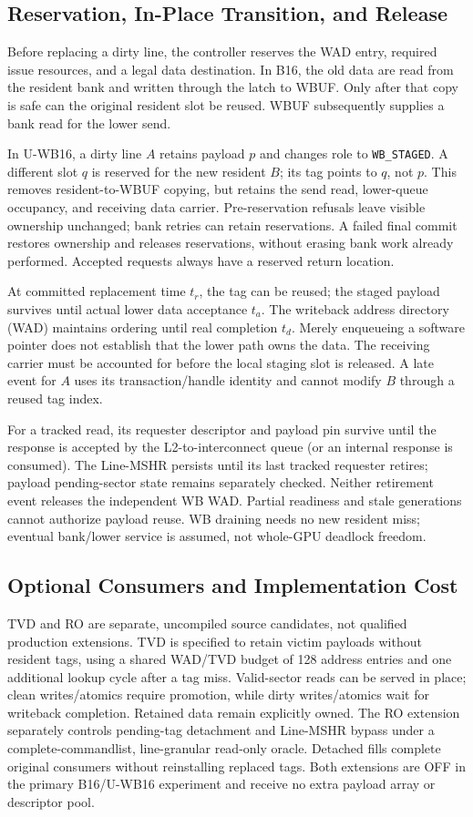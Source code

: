 \documentclass[conference,letterpaper]{IEEEtran}
\newcommand{\base}{B16}
\newcommand{\unif}{U-WB16}
\begin{document}
\subsection{Reservation, In-Place Transition, and Release}
Before replacing a dirty line, the controller reserves the WAD entry, required issue resources, and a legal data destination. In \base{}, the old data are read from the resident bank and written through the latch to WBUF. Only after that copy is safe can the original resident slot be reused. WBUF subsequently supplies a bank read for the lower send.

In \unif{}, a dirty line $A$ retains payload $p$ and changes role to \texttt{WB\_STAGED}. A different slot $q$ is reserved for the new resident $B$; its tag points to $q$, not $p$. This removes resident-to-WBUF copying, but retains the send read, lower-queue occupancy, and receiving data carrier. Pre-reservation refusals leave visible ownership unchanged; bank retries can retain reservations. A failed final commit restores ownership and releases reservations, without erasing bank work already performed. Accepted requests always have a reserved return location.

At committed replacement time $t_r$, the tag can be reused; the staged payload survives until actual lower data acceptance $t_a$. The writeback address directory (WAD) maintains ordering until real completion $t_d$. Merely enqueueing a software pointer does not establish that the lower path owns the data. The receiving carrier must be accounted for before the local staging slot is released. A late event for $A$ uses its transaction/handle identity and cannot modify $B$ through a reused tag index.

For a tracked read, its requester descriptor and payload pin survive until the response is accepted by the L2-to-interconnect queue (or an internal response is consumed). The Line-MSHR persists until its last tracked requester retires; payload pending-sector state remains separately checked. Neither retirement event releases the independent WB WAD. Partial readiness and stale generations cannot authorize payload reuse. WB draining needs no new resident miss; eventual bank/lower service is assumed, not whole-GPU deadlock freedom.

\subsection{Optional Consumers and Implementation Cost}
TVD and RO are separate, uncompiled source candidates, not qualified production extensions. TVD is specified to retain victim payloads without resident tags, using a shared WAD/TVD budget of 128 address entries and one additional lookup cycle after a tag miss. Valid-sector reads can be served in place; clean writes/atomics require promotion, while dirty writes/atomics wait for writeback completion. Retained data remain explicitly owned. The RO extension separately controls pending-tag detachment and Line-MSHR bypass under a complete-commandlist, line-granular read-only oracle. Detached fills complete original consumers without reinstalling replaced tags. Both extensions are OFF in the primary \base{}/\unif{} experiment and receive no extra payload array or descriptor pool.
\end{document}
